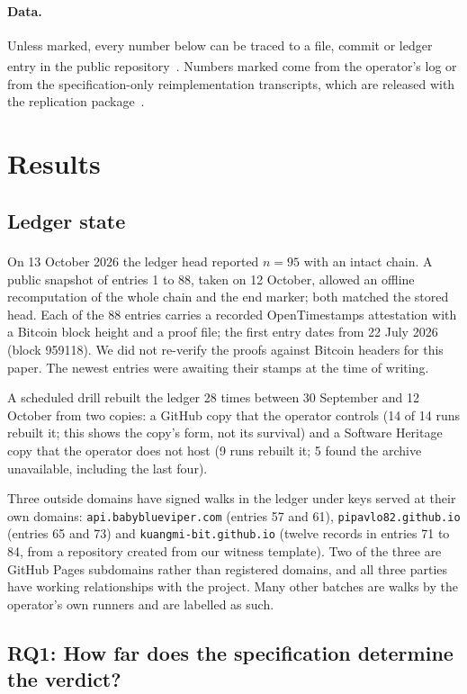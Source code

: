 \documentclass[11pt,a4paper]{article}
\newcommand{\code}[1]{\texttt{#1}}
\newcommand{\priv}{\textsuperscript{\textdagger}}
\begin{document}
\paragraph{Data.} Unless marked, every number below can be traced to a file, commit or ledger entry in the public repository~\citep{repo}. Numbers marked \priv{} come from the operator's log or from the specification-only reimplementation transcripts, which are released with the replication package~\citep{replication}.

\section{Results}\label{sec:results}

\subsection{Ledger state}\label{sec:ledger}

On 13 October 2026 the ledger head reported $n=95$ with an intact chain\priv. A public snapshot of entries 1 to 88, taken on 12 October, allowed an offline recomputation of the whole chain and the end marker; both matched the stored head. Each of the 88 entries carries a recorded OpenTimestamps attestation with a Bitcoin block height and a proof file; the first entry dates from 22 July 2026 (block 959118). We did not re-verify the proofs against Bitcoin headers for this paper. The newest entries were awaiting their stamps at the time of writing.

A scheduled drill rebuilt the ledger 28 times between 30 September and 12 October from two copies: a GitHub copy that the operator controls (14 of 14 runs rebuilt it; this shows the copy's form, not its survival) and a Software Heritage copy that the operator does not host (9 runs rebuilt it; 5 found the archive unavailable, including the last four).

Three outside domains have signed walks in the ledger under keys served at their own domains: \code{api.babyblueviper.com} (entries 57 and 61), \code{pipavlo82.github.io} (entries 65 and 73) and \code{kuangmi-bit.github.io} (twelve records in entries 71 to 84, from a repository created from our witness template). Two of the three are GitHub Pages subdomains rather than registered domains, and all three parties have working relationships with the project. Many other batches are walks by the operator's own runners and are labelled as such.

\subsection{RQ1: How far does the specification determine the verdict?}\label{sec:rq1}
\end{document}
